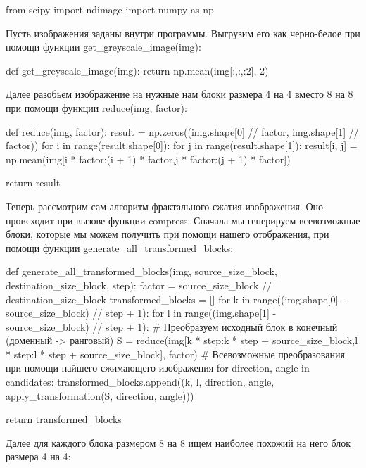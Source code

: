 \documentclass{article}
\begin{document}
\textsf{
	from scipy import ndimage
	import numpy as np }

Пусть изображения заданы внутри программы. Выгрузим его как черно-белое при помощи функции get_greyscale_image(img):
{

def get_greyscale_image(img):
	return np.mean(img[:,:,:2], 2)
}

Далее разобьем изображение на нужные нам блоки размера 4 на 4 вместо 8 на 8 при помощи функции reduce(img, factor):
{

def reduce(img, factor):
result = np.zeros((img.shape[0] // factor, img.shape[1] // factor))
for i in range(result.shape[0]):
for j in range(result.shape[1]):
result[i, j] = np.mean(img[i * factor:(i + 1) * factor,j * factor:(j + 1) * factor])

return result
}


Теперь рассмотрим сам алгоритм фрактального сжатия изображения. Оно происходит при вызове функции compress. Сначала мы генерируем всевозможные блоки, которые мы можем получить при помощи нашего отображения, при помощи
функции generate_all_transformed_blocks:
 
{
def generate_all_transformed_blocks(img, source_size_block, destination_size_block, step):
	factor = source_size_block // destination_size_block
	transformed_blocks = []
	for k in range((img.shape[0] - source_size_block) // step + 1):
		for l in range((img.shape[1] - source_size_block) // step + 1):
			# Преобразуем исходный блок в конечный (доменный -> ранговый)
			S = reduce(img[k * step:k * step + source_size_block,l * step:l * step + source_size_block], factor)
			# Всевозможные преобразования при помощи найшего сжимающего изображения
			for direction, angle in candidates:
				transformed_blocks.append((k, l, direction, angle, apply_transformation(S, direction, angle)))

	return transformed_blocks
}

Далее для каждого блока размером 8 на 8 ищем наиболее похожий на него блок размера 4 на 4:
\end{document}
